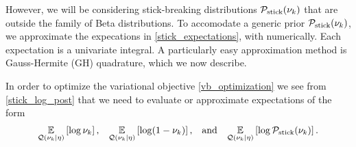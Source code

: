 However, we will be considering stick-breaking distributions $\mathcal{P}_{\mathrm{stick}}(\nu_{k})$ that
are outside the family of Beta distributions.
To accomodate a generic prior $\mathcal{P}_{\mathrm{stick}}(\nu_{k})$,
we approximate the expecations in \eqref{stick_expectations},
with numerically.
Each expectation is a univariate integral.
A particularly easy approximation method is
Gauss-Hermite (GH) quadrature, which we now describe.


In order to optimize the variational objective \eqref{vb_optimization} we see
from \eqref{stick_log_post} that we need to evaluate or approximate expectations
of the form
%
\begin{align*}
%
\expect{\q(\nuk \vert \eta)}{\log \nuk}
\textrm{,}\quad
\expect{\q(\nuk \vert \eta)}{\log (1 - \nuk)}
\textrm{,}\quad\textrm{and}\quad
\expect{\q(\nuk \vert \eta)}{\log \pstick(\nuk)}.
%
\end{align*}





